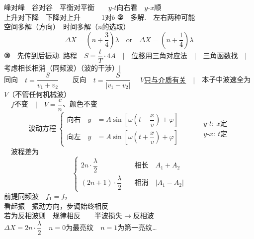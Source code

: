 峰对峰　谷对谷　平衡对平衡　　$y$-$t$向右看　$y$-$x$顺\\
上升对下降　下降对上升　　　1对$b$
\textbf{②}　多解.　左右两种可能\\
空间多解（方向）　时间多解（$n$的选取）
\[
\Delta X=\left(n+\dfrac{3}{4}\right)\lambda\quad\text{or}\quad \Delta X=\left(n+\dfrac{1}{4}\right)\lambda
\]
\textbf{③}　先传到后振动.
路程　$S=\dfrac{t}{T}\cdot 4A$　$\big|$　\underline{位移}用三角对应法　$\big|$　三角函数找　$\big|$　考虑相长相消（同频波）（波的干涉）$\big|$\\[0.8ex]
同向　$t=\dfrac{S}{v_1+v_2}$　　反向　$t=\dfrac{S}{|v_1-v_2|}$ %
　\underline{$V$只与介质有关}　$\big|$　本子中波速全为$V$（不管任何机械波）\\[1ex]
　$f$不变　$\big|$　$V=\dfrac{c}{n}$、颜色不变
\[
\text{波动方程}\ \left\{\begin{aligned}
\text{向右}\quad y&=A\sin\left[\omega\left(t-\dfrac{x}{v}\right)+\varphi\right]\\
\text{向左}\quad y&=A\sin\left[\omega\left(t+\dfrac{x}{v}\right)+\varphi\right]
\end{aligned}\right.
\qquad
\begin{aligned}
&y\text{-}t:\ x\text{定}\\
&y\text{-}x:\ t\text{定}
\end{aligned}
\]
　波程差为
\[
\left\{\begin{aligned}
2n\cdot\dfrac{\lambda}{2}&\quad\text{相长}\quad A_1+A_2\\
(2n+1)\cdot\dfrac{\lambda}{2}&\quad\text{相消}\quad |A_1-A_2|
\end{aligned}\right.
\]
前提同频波　$f_1=f_2$\\
看起振　振动方向，步调始终相反\\
若为反相波则　规律相反　　半波损失$\to$反相波\\[1ex]
$\Delta X=2n\cdot\dfrac{\lambda}{2}$　$n=0$为最亮纹　$n=1$为第一亮纹…\\[1ex]
